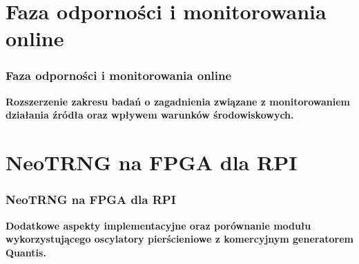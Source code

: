 \documentclass{beamer}
\begin{document}
\section{Faza odporności i monitorowania online}
\begin{frame}
\frametitle{Faza odporności i monitorowania online}

\Large
\textbf{Rozszerzenie zakresu badań o zagadnienia związane z monitorowaniem 
działania źródła oraz wpływem warunków środowiskowych.}

\end{frame}
\section{NeoTRNG na FPGA dla RPI}
\begin{frame}
\frametitle{NeoTRNG na FPGA dla RPI}

\Large
\textbf{Dodatkowe aspekty implementacyjne oraz porównanie 
modułu wykorzystującego oscylatory pierścieniowe z komercyjnym generatorem Quantis.}

\end{frame}
\begin{frame}
\frametitle{}
\end{frame}
\end{document}
